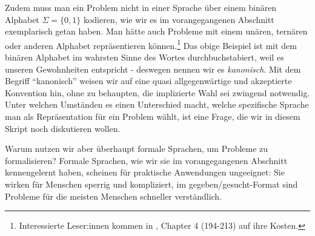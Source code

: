 Zudem muss man ein Problem nicht in einer Sprache über einem binären Alphabet
$\Sigma = \{0,1\}$ kodieren,
wie wir es im vorangegangenen Abschnitt exemplarisch getan haben.
Man hätte auch Probleme mit einem unären, ternären
oder anderen Alphabet repräsentieren können.\footnote{
    Interessierte Leser:innen kommen in \cite{knuth2}, Chapter 4 (194-213) auf ihre Kosten.
}
Das obige Beispiel ist mit dem binären Alphabet im wahrsten Sinne des Wortes durchbuchstabiert,
weil es unseren Gewohnheiten entspricht
- deswegen nennen wir es \emph{kanonisch}.
Mit dem Begriff ``kanonisch'' weisen wir
auf eine quasi allgegenwärtige und akzeptierte Konvention hin,
ohne zu behaupten, die implizierte Wahl sei zwingend notwendig.
Unter welchen Umständen es einen Unterschied macht,
welche spezifische Sprache man als Repräsentation für ein Problem wählt,
ist eine Frage,
die wir in diesem Skript noch diskutieren wollen.


Warum nutzen wir aber überhaupt formale Sprachen,
um Probleme zu formalisieren?
Formale Sprachen,
wie wir sie im vorangegangenen Abschnitt kennengelernt haben,
scheinen für praktische Anwendungen ungeeignet:
Sie wirken für Menschen sperrig und kompliziert,
im gegeben/gesucht-Format sind Probleme für die meisten Menschen schneller verständlich.

